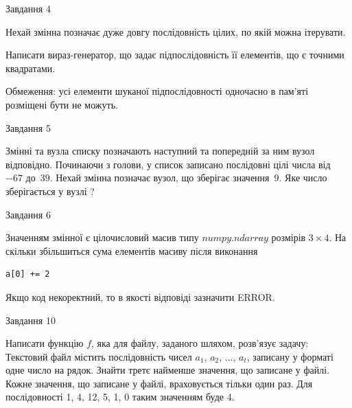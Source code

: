 \documentclass[12pt, ukrainian]{article}
\begin{document}
{               
{\begin{center}Завдання {4}\end{center}}
\vspace{-4mm}
Нехай змінна  позначає дуже довгу послідовність цілих, по якій можна ітерувати.

Написати вираз-генератор, що задає підпослідовність її елементів, що є точними квадратами.

Обмеження: усі елементи шуканої підпослідовності одночасно в пам'яті розміщені бути не можуть.\par

\vspace{10mm}
               
{\begin{center}Завдання {5}\end{center}}
\vspace{-4mm}
Змінні  та  вузла списку позначають наступний та попередній за ним вузол відповідно. Починаючи з голови, у список записано послідовні цілі числа від~$-67$ до~$39$. Нехай змінна  позначає вузол, що зберігає значення~$9$.
Яке число зберігається у вузлі  ?\par

               
{\begin{center}Завдання {6}\end{center}}
\vspace{-4mm}
Значенням змінної  є цілочисловий масив типу $numpy.ndarray$ розмірів $3{\times}4$. На скільки збільшиться сума елементів масиву  після виконання
\begin{verbatim}
a[0] += 2
\end{verbatim}


Якщо код некоректний, то в якості відповіді зазначити ERROR.\par

               
{\begin{center}Завдання {10}\end{center}}
\vspace{-4mm}

Написати функцію $f$, яка для файлу, заданого шляхом, розв’язує задачу:\\ Текстовий файл містить послідовність чисел $a_1$, $a_2$, $\ldots$, $a_t$, записану у форматі одне число на рядок. Знайти третє найменше значення, що записане у файлі. Кожне значення, що записане у файлі, враховується тільки один раз. Для послідовності 1, 4, 12, 5, 1, 0 таким значенням буде 4.

}
\end{document}
